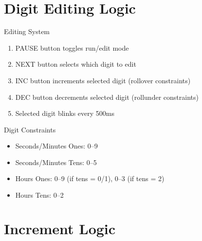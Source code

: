 \documentclass{beamer}
\begin{document}
\section{Digit Editing Logic}
\begin{frame}{Editing System}
\begin{enumerate}
    \item PAUSE button toggles run/edit mode
    \item NEXT button selects which digit to edit
    \item INC button increments selected digit (rollover constraints)
    \item DEC button decrements selected digit (rollunder constraints)
    \item Selected digit blinks every 500ms
\end{enumerate}
\end{frame}

\begin{frame}{Digit Constraints}
\begin{itemize}
    \item Seconds/Minutes Ones: 0–9
    \item Seconds/Minutes Tens: 0–5
    \item Hours Ones: 0–9 (if tens = 0/1), 0–3 (if tens = 2)
    \item Hours Tens: 0–2
\end{itemize}
\end{frame}

\section{Increment Logic}
\end{document}
